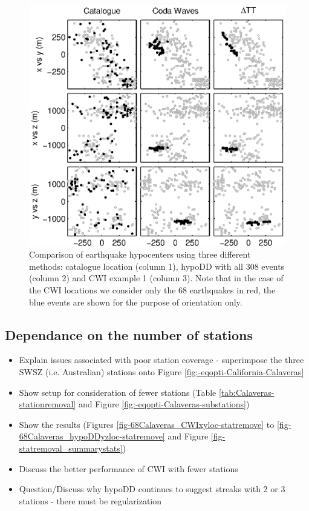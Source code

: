 \documentclass[extra]{gji}
\begin{document}
\begin{figure}
\includegraphics{diags/CalaverasLoc1.eps}
\caption{Comparison of earthquake hypocenters using three different methods: catalogue location (column 1), hypoDD with all
308 events (column 2) and CWI example 1 (column 3).
Note that in the case of the CWI locations we consider only the 68 earthquakes in red, the
blue events are shown for the purpose of orientation only.}
\label{fig-69Calaverasevents_eg1}
\end{figure}


\subsection{Dependance on the number of stations}

\begin{itemize}
\item Explain issues associated with poor station coverage - superimpose
the three SWSZ (i.e. Australian) stations onto  Figure
\ref{fig:-eqopti-California-Calaveras}
\item Show setup for consideration of fewer stations (Table
\ref{tab:Calaveras-stationremoval}
and Figure \ref{fig:-eqopti-Calaveras-substations})
\item Show the results (Figures \ref{fig-68Calaveras_CWIxyloc-statremove}
to \ref{fig-68Calaveras_hypoDDyzloc-statremove} and Figure \ref{fig-statremoval_summarystats})
\item Discuss the better performance of CWI with fewer stations
\item Question/Discuss why hypoDD continues to suggest streaks with 2 or 3 stations - there must be regularization
\end{itemize}
\end{document}
